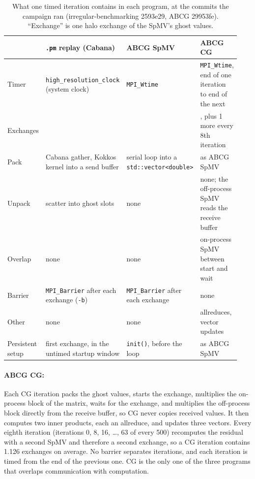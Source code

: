 \documentclass[11pt]{article}
\newcommand{\pmrep}{\texttt{.pm} replay}
\begin{document}
\begin{table}[t]
\centering
\caption{What one timed iteration contains in each program, at the commits the campaign
ran (irregular-benchmarking 2593e29, ABCG 29953fe). ``Exchange'' is one halo exchange of
the SpMV's ghost values.}
\label{tab:codepaths}
\small
\begin{tabular}{@{}>{\raggedright\arraybackslash}p{0.16\linewidth}>{\raggedright\arraybackslash}p{0.26\linewidth}>{\raggedright\arraybackslash}p{0.26\linewidth}>{\raggedright\arraybackslash}p{0.26\linewidth}@{}}
\toprule
& \pmrep{} (Cabana) & ABCG SpMV & ABCG CG \\
\midrule
Timer & \texttt{high\_resolution\_clock} (system clock) & \texttt{MPI\_Wtime} & \texttt{MPI\_Wtime}, end of one iteration to end of the next \\
Exchanges & 1 & 1 & 1, plus 1 more every 8th iteration \\
Pack & Cabana gather, Kokkos kernel into a send buffer & serial loop into a \texttt{std::vector<double>} & as ABCG SpMV \\
Unpack & scatter into ghost slots & none & none; the off-process SpMV reads the receive buffer \\
Overlap & none & none & on-process SpMV between start and wait \\
Barrier & \texttt{MPI\_Barrier} after each exchange (\texttt{-b}) & \texttt{MPI\_Barrier} after each exchange & none \\
Other & none & none & 2 allreduces, vector updates \\
Persistent setup & first exchange, in the untimed startup window & \texttt{init()}, before the loop & as ABCG SpMV \\
\bottomrule
\end{tabular}
\end{table}

\paragraph{ABCG CG:} Each CG iteration packs the ghost values, starts the exchange,
multiplies the on-process block of the matrix, waits for the exchange, and multiplies the
off-process block directly from the receive buffer, so CG never copies received values.
It then computes two inner products, each an allreduce, and updates three vectors. Every
eighth iteration (iterations 0, 8, 16, \ldots, 63 of every 500) recomputes the residual
with a second SpMV and therefore a second exchange, so a CG iteration contains 1.126
exchanges on average. No barrier separates iterations, and each iteration is timed from
the end of the previous one. CG is the only one of the three programs that overlaps
communication with computation.
\end{document}
